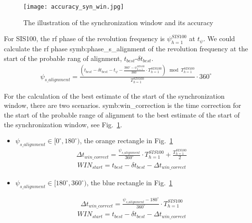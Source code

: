 \begin{figure}[!htb]
   \centering   
   \texttt{[image: accuracy\_syn\_win.jpg]}
   \caption{The illustration of the synchronization window and its accuracy}
   \label{accuracy_syn_win}
\end{figure}

For SIS100, the rf phase of the revolution frequency is $\psi_{h=1}^{SIS100}$ at $t_{\psi}$. We could calculate the rf phase \gls{symb:phase_s_alignment} of the revolution frequency at the start of the probable rang of alignment, $t_{best}$-$\delta t_{best}$.
\begin{equation}
\begin{aligned}
\psi_{s\_alignment}=\frac{(t_{best}-\delta t_{best}-t_{\psi}- \frac{360^\circ-\psi_{h=1}^{SIS100}}{360^\circ} \cdot {T_{h=1}^{SIS100}}) \mod T_{h=1}^{SIS100}}{T_{h=1}^{SIS100}}\cdot {360^\circ} 
\label{phase_after_syn}
\end{aligned}
\end{equation}

For the calculation of the best estimate of the start of the synchronization window, there are two scenarios. \gls{symb:win_correction} is the time correction for the start of the probable range of alignment to the best estimate of the start of the synchronization  window, see Fig.~\ref{accuracy_syn_win}.
\begin{itemize}
\item $\psi_{s\_alignment}\in [0^\circ,180^\circ)$, the orange rectangle in Fig.~\ref{accuracy_syn_win}
\begin{equation}
\begin{aligned}
\Delta t_{win \_correct}=\frac{\psi_{s\_alignment}}{360^\circ}\cdot T_{h=1}^{SIS100}+\frac{T_{h=1}^{SIS100}}{2}
\end{aligned}
\end{equation}
\begin{equation}
\begin{aligned}
WIN_{start}= t_{best}- \delta t_{best}-\Delta t_{win \_correct}
\end{aligned}
\end{equation}


\item $\psi_{s\_alignment}\in [180^\circ,360^\circ)$, the blue rectangle in Fig.~\ref{accuracy_syn_win}

\begin{equation}
\begin{aligned}
\Delta t_{win \_correct}=\frac{\psi_{s\_alignment}-180^\circ}{360^\circ}\cdot T_{h=1}^{SIS100}
\end{aligned}
\end{equation}
\begin{equation}
\begin{aligned}
WIN_{start}= t_{best}- \delta t_{best}-\Delta t_{win \_correct}
\end{aligned}
\end{equation}

\end{itemize}

